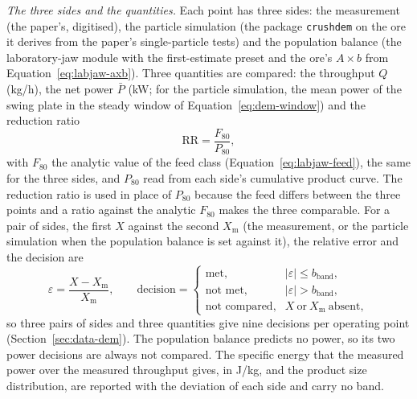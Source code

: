 \emph{The three sides and the quantities.} Each point has three sides: the measurement (the paper's, digitised), the particle simulation (the package \texttt{crushdem} on the ore it derives from the paper's single-particle tests) and the population balance (the laboratory-jaw module with the first-estimate preset and the ore's $A\times b$ from Equation~\eqref{eq:labjaw-axb}). Three quantities are compared: the throughput $Q$ (kg/h), the net power $\bar P$ (kW; for the particle simulation, the mean power of the swing plate in the steady window of Equation~\eqref{eq:dem-window}) and the reduction ratio
\begin{equation}
\mathrm{RR}=\frac{F_{80}}{P_{80}},
\label{eq:proto-rr}
\end{equation}
with $F_{80}$ the analytic value of the feed class (Equation~\eqref{eq:labjaw-feed}), the same for the three sides, and $P_{80}$ read from each side's cumulative product curve. The reduction ratio is used in place of $P_{80}$ because the feed differs between the three points and a ratio against the analytic $F_{80}$ makes the three comparable. For a pair of sides, the first $X$ against the second $X_{\mathrm m}$ (the measurement, or the particle simulation when the population balance is set against it), the relative error and the decision are
\begin{equation}
\varepsilon=\frac{X-X_{\mathrm m}}{X_{\mathrm m}},\qquad
\text{decision}=\begin{cases}\text{met}, & \lvert\varepsilon\rvert\le b_{\mathrm{band}},\\ \text{not met}, & \lvert\varepsilon\rvert>b_{\mathrm{band}},\\ \text{not compared}, & X\ \text{or}\ X_{\mathrm m}\ \text{absent},\end{cases}
\label{eq:proto-band}
\end{equation}
so three pairs of sides and three quantities give nine decisions per operating point (Section~\ref{sec:data-dem}). The population balance predicts no power, so its two power decisions are always not compared. The specific energy that the measured power over the measured throughput gives, in J/kg, and the product size distribution, are reported with the deviation of each side and carry no band.

